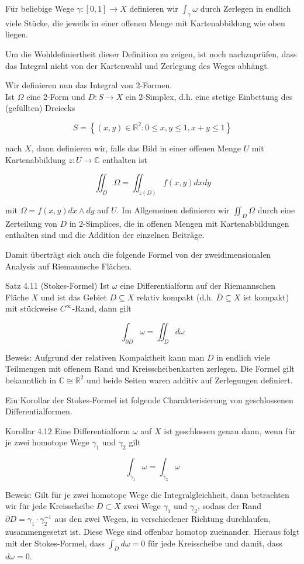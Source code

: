 \documentclass[10pt, letterpaper]{article}
\begin{document}
Für beliebige Wege $\gamma:[0,1] \rightarrow X$ definieren wir $\int_{\gamma} \omega$ durch Zerlegen in endlich viele Stücke, die jeweils in einer offenen Menge mit Kartenabbildung wie oben liegen.

Um die Wohldefiniertheit dieser Definition zu zeigen, ist noch nachzuprüfen, dass das Integral nicht von der Kartenwahl und Zerlegung des Weges abhängt.

Wir definieren nun das Integral von 2-Formen.\\
Ist $\Omega$ eine 2-Form und $D: S \rightarrow X$ ein 2-Simplex, d.h. eine stetige Einbettung des (gefüllten) Dreiecks

$$
S=\left\{(x, y) \in \mathbb{R}^{2}: 0 \leq x, y \leq 1, x+y \leq 1\right\}
$$

nach $X$, dann definieren wir, falls das Bild in einer offenen Menge $U$ mit Kartenabbildung $z: U \rightarrow \mathbb{C}$ enthalten ist

$$
\iint_{D} \Omega=\iint_{z(D)} f(x, y) d x d y
$$

mit $\Omega=f(x, y) d x \wedge d y$ auf $U$. Im Allgemeinen definieren wir $\iint_{D} \Omega$ durch eine Zerteilung von $D$ in 2-Simplices, die in offenen Mengen mit Kartenabbildungen enthalten sind und die Addition der einzelnen Beiträge.

Damit überträgt sich auch die folgende Formel von der zweidimensionalen Analysis auf Riemannsche Flächen.

Satz 4.11 (Stokes-Formel) Ist $\omega$ eine Differentialform auf der Riemannschen Fläche $X$ und ist das Gebiet $D \subseteq X$ relativ kompakt (d.h. $\bar{D} \subseteq X$ ist kompakt) mit stückweise $C^{\infty}$-Rand, dann gilt

$$
\int_{\partial D} \omega=\iint_{D} d \omega
$$

Beweis: Aufgrund der relativen Kompaktheit kann man $D$ in endlich viele Teilmengen mit offenem Rand und Kreisscheibenkarten zerlegen. Die Formel gilt bekanntlich in $\mathbb{C} \cong \mathbb{R}^{2}$ und beide Seiten waren additiv auf Zerlegungen definiert.

Ein Korollar der Stokes-Formel ist folgende Charakterisierung von geschlossenen Differentialformen.

Korollar 4.12 Eine Differentialform $\omega$ auf $X$ ist geschlossen genau dann, wenn für je zwei homotope Wege $\gamma_{1}$ und $\gamma_{2}$ gilt

$$
\int_{\gamma_{1}} \omega=\int_{\gamma_{2}} \omega
$$

Beweis: Gilt für je zwei homotope Wege die Integralgleichheit, dann betrachten wir für jede Kreisscheibe $D \subset X$ zwei Wege $\gamma_{1}$ und $\gamma_{2}$, sodass der Rand $\partial D=\gamma_{1} \cdot \gamma_{2}^{-1}$ aus den zwei Wegen, in verschiedener Richtung durchlaufen, zusammengesetzt ist. Diese Wege sind offenbar homotop zueinander. Hieraus folgt mit der Stokes-Formel, dass $\int_{D} d \omega=0$ für jede Kreisscheibe und damit, dass $d \omega=0$.
\end{document}
